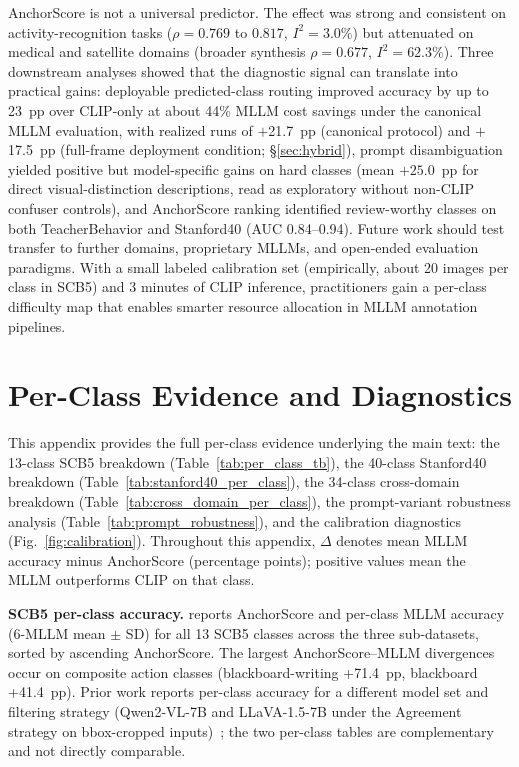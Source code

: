 \documentclass[a4paper,fleqn]{cas-sc}
\begin{document}
AnchorScore is not a universal predictor. The effect was strong and consistent on activity-recognition tasks ($\rho=0.769$ to $0.817$, $I^2=3.0\%$) but attenuated on medical and satellite domains (broader synthesis $\rho=0.677$, $I^2=62.3\%$). Three downstream analyses showed that the diagnostic signal can translate into practical gains: deployable predicted-class routing improved accuracy by up to 23~pp over CLIP-only at about 44\% MLLM cost savings under the canonical MLLM evaluation, with realized runs of $+$21.7~pp (canonical protocol) and $+$17.5~pp (full-frame deployment condition; \S\ref{sec:hybrid}), prompt disambiguation yielded positive but model-specific gains on hard classes (mean $+25.0$~pp for direct visual-distinction descriptions, read as exploratory without non-CLIP confuser controls), and AnchorScore ranking identified review-worthy classes on both TeacherBehavior and Stanford40 (AUC 0.84--0.94). Future work should test transfer to further domains, proprietary MLLMs, and open-ended evaluation paradigms. With a small labeled calibration set (empirically, about 20 images per class in SCB5) and 3 minutes of CLIP inference, practitioners gain a per-class difficulty map that enables smarter resource allocation in MLLM annotation pipelines.



\appendix
\setcounter{figure}{0}
\renewcommand{\thefigure}{A\arabic{figure}}
\setcounter{table}{0}
\renewcommand{\thetable}{A\arabic{table}}
\clearpage
\section{Per-Class Evidence and Diagnostics}
\label{app:materials}

This appendix provides the full per-class evidence underlying the main text: the 13-class SCB5 breakdown (Table~\ref{tab:per_class_tb}), the 40-class Stanford40 breakdown (Table~\ref{tab:stanford40_per_class}), the 34-class cross-domain breakdown (Table~\ref{tab:cross_domain_per_class}), the prompt-variant robustness analysis (Table~\ref{tab:prompt_robustness}), and the calibration diagnostics (Fig.~\ref{fig:calibration}). Throughout this appendix, $\Delta$ denotes mean MLLM accuracy minus AnchorScore (percentage points); positive values mean the MLLM outperforms CLIP on that class.

\textbf{SCB5 per-class accuracy.}  reports AnchorScore and per-class MLLM accuracy (6-MLLM mean $\pm$ SD) for all 13 SCB5 classes across the three sub-datasets, sorted by ascending AnchorScore. The largest AnchorScore--MLLM divergences occur on composite action classes (blackboard-writing +71.4~pp, blackboard +41.4~pp). Prior work reports per-class accuracy for a different model set and filtering strategy (Qwen2-VL-7B and LLaVA-1.5-7B under the Agreement strategy on bbox-cropped inputs)~\cite{ma2026agreement}; the two per-class tables are complementary and not directly comparable.
\end{document}

